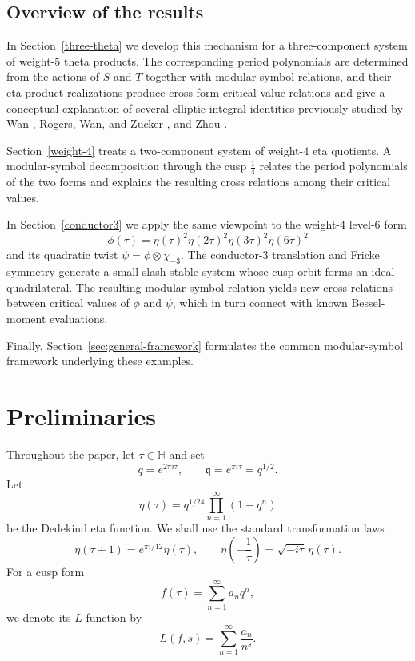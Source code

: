 \documentclass[preprint,12pt]{elsarticle}
\theoremstyle{definition}
\theoremstyle{remark}
\newcommand{\HH}{\mathbb{H}}
\begin{document}
\subsection{Overview of the results}

In Section~\ref{three-theta} we develop this mechanism for a three-component
system of weight-$5$ theta products. The corresponding period polynomials are
determined from the actions of $S$ and $T$ together with modular symbol
relations, and their eta-product realizations produce cross-form
critical value relations and give a conceptual explanation of several
elliptic integral identities previously studied by Wan \cite{MR2845511},
Rogers, Wan, and Zucker \cite{MR3338042}, and Zhou \cite{MR3231318}.

Section~\ref{weight-4} treats a two-component system of weight-$4$ eta
quotients. A modular-symbol decomposition through the cusp $\frac{1}{4}$ relates the
period polynomials of the two forms and explains the resulting cross relations
among their critical values.

In Section~\ref{conductor3} we apply the same viewpoint to the weight-$4$
level-$6$ form
\[
\phi(\tau)=\eta(\tau)^2\eta(2\tau)^2\eta(3\tau)^2\eta(6\tau)^2
\]
and its quadratic twist $\psi=\phi\otimes\chi_{-3}$. The conductor-$3$
translation and Fricke symmetry generate a small slash-stable system whose
cusp orbit forms an ideal quadrilateral. The resulting modular symbol
relation yields new cross relations between critical values of $\phi$ and
$\psi$, which in turn connect with known Bessel-moment evaluations.

Finally, Section~\ref{sec:general-framework} formulates the common
modular-symbol framework underlying these examples.


	
\section{Preliminaries}
	\label{sec:preliminaries}
Throughout the paper, let $\tau\in\HH$ and set
\[
	q=e^{2\pi i\tau},\qquad \mathfrak q=e^{\pi i\tau}=q^{1/2}.
\]
Let
	\[
	\eta(\tau)=q^{1/24}\prod_{n=1}^{\infty}(1-q^n)
	\]
be the Dedekind eta function. We shall use the standard transformation laws
	\[
	\eta(\tau+1)=e^{\pi i/12}\eta(\tau),
	\qquad
	\eta\left(-\frac{1}{\tau}\right)=\sqrt{-i\tau}\,\eta(\tau).
	\]
For a cusp form
	\[
	f(\tau)=\sum_{n=1}^{\infty}a_nq^n,
	\]
we denote its $L$-function by
	\[
	L(f,s)=\sum_{n=1}^{\infty}\frac{a_n}{n^s}.
	\]
	
\end{document}
